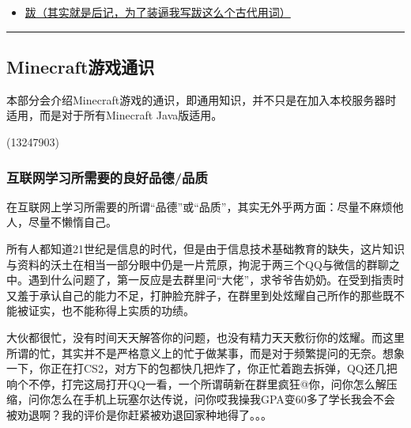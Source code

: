 \documentclass[
]{article}
\providecommand{\tightlist}{%
  \setlength{\itemsep}{0pt}\setlength{\parskip}{0pt}}
\begin{document}
\begin{itemize}
  \begin{itemize}
  \tightlist
  \item
    \hyperref[section-32]{整合包相关}

    \begin{itemize}
    \tightlist
    \item
      \hyperref[section-33]{屏幕上会显示背包内容}
    \item
      \hyperref[section-34]{飞行有问题}
    \end{itemize}
  \end{itemize}
\item
  \hyperref[section-35]{跋（其实就是后记，为了装逼我写跋这么个古代用词）}
\end{itemize}

\begin{center}\rule{0.5\linewidth}{0.5pt}\end{center}

\subsection{Minecraft游戏通识}\label{minecraft}

本部分会介绍Minecraft游戏的通识，即通用知识，并不只是在加入本校服务器时适用，而是对于所有Minecraft
Java版适用。

\begin{flushright}(13247903)\end{flushright}

\subsubsection{互联网学习所需要的良好品德/品质}\label{section-2}

在互联网上学习所需要的所谓``品德''或``品质''，其实无外乎两方面：尽量不麻烦他人，尽量不懒惰自己。

所有人都知道21世纪是信息的时代，但是由于信息技术基础教育的缺失，这片知识与资料的沃土在相当一部分眼中仍是一片荒原，拘泥于两三个QQ与微信的群聊之中。遇到什么问题了，第一反应是去群里问``大佬''，求爷爷告奶奶。在受到指责时又羞于承认自己的能力不足，打肿脸充胖子，在群里到处炫耀自己所作的那些既不能被证实，也不能称得上实质的功绩。

大伙都很忙，没有时间天天解答你的问题，也没有精力天天敷衍你的炫耀。而这里所谓的忙，其实并不是严格意义上的忙于做某事，而是对于频繁提问的无奈。想象一下，你正在打CS2，对方下的包都快几把炸了，你正忙着跑去拆弹，QQ还几把响个不停，打完这局打开QQ一看，一个所谓萌新在群里疯狂@你，问你怎么解压缩，问你怎么在手机上玩塞尔达传说，问你哎我操我GPA变60多了学长我会不会被劝退啊？我的评价是你赶紧被劝退回家种地得了。。。
\end{document}
